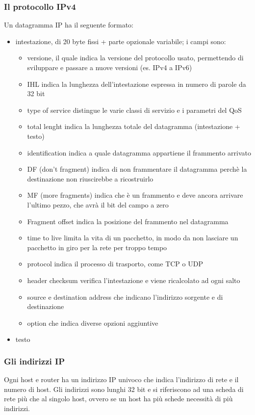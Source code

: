 \subsubsection{Il protocollo IPv4}
Un datagramma IP ha il seguente formato:
\begin{itemize}
\item intestazione, di 20 byte fissi + parte opzionale variabile; i campi sono:
\begin{itemize}
\item versione, il quale indica la versione del protocollo usato, permettendo di sviluppare e passare a nuove versioni (es. IPv4 a IPv6)
\item IHL indica la lunghezza dell'intestazione espressa in numero di parole da 32 bit
\item type of service distingue le varie classi di servizio e i parametri del QoS
\item total lenght indica la lunghezza totale del datagramma (intestazione + testo)
\item identification indica a quale datagramma appartiene il frammento arrivato
\item DF (don't fragment) indica di non frammentare il datagramma perchè la destinazione non riuscirebbe a ricostruirlo
\item MF (more fragments) indica che è un frammento e deve ancora arrivare l'ultimo pezzo, che avrà il bit del campo a zero
\item Fragment offset indica la posizione del frammento nel datagramma
\item time to live limita la vita di un pacchetto, in modo da non lasciare un pacchetto in giro per la rete per troppo tempo
\item protocol indica il processo di trasporto, come TCP o UDP
\item header checksum verifica l'intestazione e viene ricalcolato ad ogni salto
\item source e destination address che indicano l'indirizzo sorgente e di destinazione
\item option che indica diverse opzioni aggiuntive
\end{itemize}
\item testo
\end{itemize}

\subsubsection{Gli indirizzi IP}
Ogni host e router ha un indirizzo IP univoco che indica l'indirizzo di rete e il numero di host. 
Gli indirizzi sono lunghi 32 bit e si riferiscono ad una scheda di rete più che al singolo host, ovvero se un host ha più schede necessità di più indirizzi.

